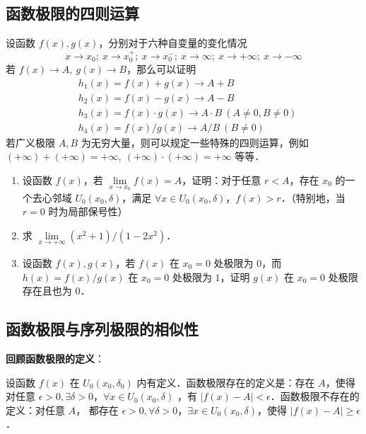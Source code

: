 \subsection{函数极限的四则运算}
设函数 $f(x),g(x)$，分别对于六种自变量的变化情况
\begin{equation}
  x\rightarrow x_0;\ x\rightarrow x_0^+;\ x\rightarrow x_0^{-};\ x\rightarrow \infty;\ x\rightarrow +\infty;\ x\rightarrow -\infty
\end{equation}
  若 $f(x)\rightarrow A,\ g(x)\rightarrow B$，那么可以证明
\begin{equation}
  \begin{aligned}
  &h_1(x)=f(x)+g(x)\rightarrow A+B\\
  &h_2(x)=f(x)-g(x)\rightarrow A-B\\
  &h_3(x)=f(x)\cdot g(x)\rightarrow A\cdot B\ (A\neq 0,B\neq 0)\\
  &h_4(x)=f(x)/ g(x)\rightarrow A/B\ (B\neq 0)
  \end{aligned}
\end{equation}
  若广义极限 $A,B$ 为无穷大量，则可以规定一些特殊的四则运算，例如 $(+\infty)+(+\infty)=+\infty,\ 
  (+\infty)\cdot (+\infty)=+\infty$ 等等．
\begin{exercise}{}
\begin{enumerate}
\item  设函数 $f(x)$，若 $\lim\limits_{x\rightarrow x_0}f(x)=A$，证明：对于任意 $r<A$，存在 $x_0$ 的一个去心邻域 $U_0(x_0,\delta)$，满足 $\forall x\in U_0(x_0,\delta)$，$f(x)>r$．（特别地，当 $r=0$ 时为局部保号性）
\item 求 $\lim\limits_{x\rightarrow +\infty}(x^2+1)/(1-2x^2)$．
\item 设函数 $f(x),g(x)$，若 $f(x)$ 在 $x_0=0$ 处极限为 $0$，而 $h(x)=f(x)/g(x)$ 在 $x_0=0$ 处极限为 $1$，证明 $g(x)$ 在 $x_0=0$ 处极限存在且也为 $0$．
\end{enumerate}

\end{exercise}

\subsection{函数极限与序列极限的相似性}
\textbf{回顾函数极限的定义}：

设函数 $f(x)$ 在 $U_0(x_0,\delta_0)$ 内有定义．函数极限存在的定义是：存在 $A$，使得对任意 $\epsilon >0, \exists \delta>0$，$\forall x\in U_0(x_0,\delta)$ ，有 $|f(x)-A|<\epsilon$．函数极限不存在的定义：对任意 $A$， 都存在 $\epsilon>0,\forall \delta>0$，$\exists x\in U_0(x_0,\delta)$，使得 $|f(x)-A|\ge \epsilon$．

